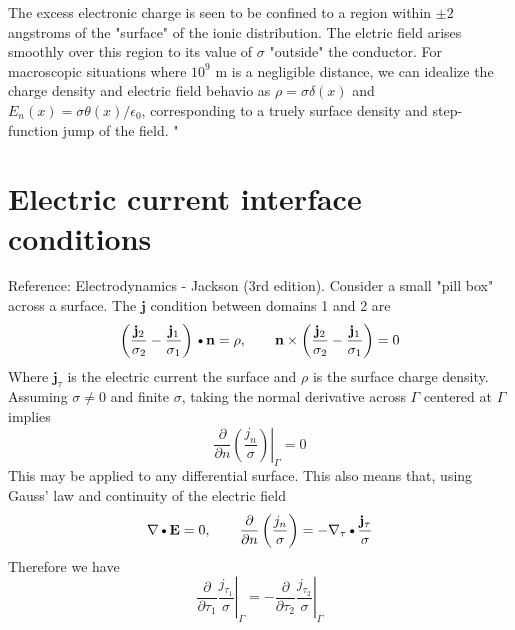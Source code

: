 \documentclass[11pt]{article}
\newcommand{\PD}{\partial}
\newcommand{\J}{\mathbf{j}}
\newcommand{\E}{\mathbf{E}}
\newcommand{\N}{\mathbf{n}}
\newcommand{\DOT}{\text{\textbullet}}
\begin{document}
The excess electronic charge is seen to be confined to a region within $\pm 2$ angstroms of the "surface" of the ionic distribution. The elctric field arises smoothly over this region to its value of $\sigma$ "outside" the conductor. For macroscopic situations where $10^9$ m is a negligible distance, we can idealize the charge density and electric field behavio as $\rho = \sigma \delta(x)$ and $E_n(x) = \sigma \theta(x)/\epsilon_0$, corresponding to a truely surface density and step-function jump of the field.
"

\section{Electric current interface conditions}
Reference: Electrodynamics - Jackson (3rd edition). Consider a small "pill box" across a surface. The $\J$ condition between domains 1 and 2 are
\begin{equation}
  \left( \frac{\J_2}{\sigma_2} - \frac{\J_1}{\sigma_1} \right) \DOT \N = \rho
  , \qquad
  \N \times \left( \frac{\J_2}{\sigma_2} - \frac{\J_1}{\sigma_1} \right) = 0
\end{equation}
Where $\J_{\tau}$ is the electric current the surface and $\rho$ is the surface charge density. Assuming $\sigma \ne 0$ and finite $\sigma$, taking the normal derivative across $\Gamma$ centered at $\Gamma$ implies
\begin{equation}
  \boxed{
  \left. \frac{\PD}{\PD n} \left(\frac{j_n}{\sigma} \right) \right|_{\Gamma} = 0
  }
\end{equation}
This may be applied to any differential surface. This also means that, using Gauss' law and continuity of the electric field
\begin{equation}
    \nabla \DOT \E = 0
    , \qquad
    \frac{\PD}{\PD n} \left(\frac{j_n}{\sigma} \right) = - \nabla_{\tau} \DOT \frac{\J_{\tau}}{\sigma}
\end{equation}
Therefore we have
\begin{equation}
  \boxed{
  \left. \frac{\PD}{\PD \tau_1} \frac{j_{\tau_1}}{\sigma} \right|_{\Gamma} = - 
  \left. \frac{\PD}{\PD \tau_2} \frac{j_{\tau_2}}{\sigma} \right|_{\Gamma}
  }
\end{equation}
\end{document}
